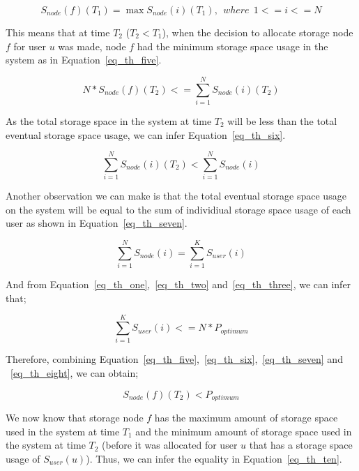 \begin{equation}
S_{node}(f)(T_1) = \max{S_{node}(i)(T_1)},\ \ where\ \ 1 <= i <= N
\label{eq_th_four}
\end{equation}
\hfill

This means that at time $T_2$ ($T_2 < T_1$), when the decision to allocate storage node $f$ for
user $u$ was made, node $f$ had the minimum storage space usage in the system as in Equation~\eqref{eq_th_five}.

\begin{equation}
N * S_{node}(f)(T_2) <= \sum\limits_{i=1}^{N}S_{node}(i)(T_2)
\label{eq_th_five}
\end{equation}
\hfill

As the total storage space in the system at time $T_2$ will be less than the total eventual storage
space usage, we can infer Equation~\eqref{eq_th_six}.

\begin{equation}
\sum\limits_{i=1}^{N}S_{node}(i)(T_2) < \sum\limits_{i=1}^{N}S_{node}(i)
\label{eq_th_six}
\end{equation}
\hfill

Another observation we can make is that the total eventual storage space usage on the system
will be equal to the sum of individiual storage space usage of each user as shown in Equation~\eqref{eq_th_seven}. 

\begin{equation}
\sum\limits_{i=1}^{N}S_{node}(i) = \sum\limits_{i=1}^{K}S_{user}(i)
\label{eq_th_seven}
\end{equation}
\hfill

And from Equation~\eqref{eq_th_one},~\eqref{eq_th_two} and~\eqref{eq_th_three}, we can infer that;

\begin{equation}
\sum\limits_{i=1}^{K}S_{user}(i) <= N * P_{optimum}
\label{eq_th_eight}
\end{equation}
\hfill

Therefore, combining Equation~\eqref{eq_th_five},~\eqref{eq_th_six},~\eqref{eq_th_seven} and
~\eqref{eq_th_eight}, we can obtain;

\begin{equation}
S_{node}(f)(T_2) < P_{optimum}
\label{eq_th_nine}
\end{equation}
\hfill

We now know that storage node $f$ has the maximum amount of storage space used in the system at
time $T_1$ and the minimum amount of storage space used in the system at time $T_2$ (before it
was allocated for user $u$ that has a storage space usage of $S_{user}(u)$). Thus, we can infer
the equality in Equation~\eqref{eq_th_ten}.


